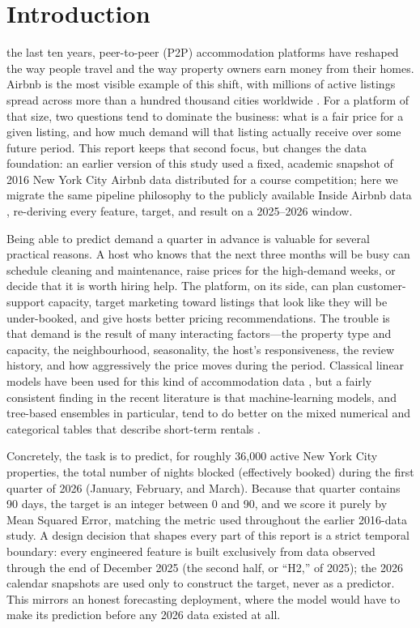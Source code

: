 \documentclass[journal]{IEEEtran}
\begin{document}
\section{Introduction}
 the last ten years, peer-to-peer (P2P) accommodation
platforms have reshaped the way people travel and the way property owners earn
money from their homes. Airbnb is the most visible example of this shift, with
millions of active listings spread across more than a hundred thousand cities
worldwide \cite{adamiak2018}. For a platform of that size, two questions tend
to dominate the business: what is a fair price for a given listing, and how
much demand will that listing actually receive over some future period. This
report keeps that second focus, but changes the data foundation: an earlier
version of this study used a fixed, academic snapshot of 2016 New York City
Airbnb data distributed for a course competition; here we migrate the same
pipeline philosophy to the publicly available Inside Airbnb data
\cite{insideairbnb}, re-deriving every feature, target, and result on a
2025--2026 window.

Being able to predict demand a quarter in advance is valuable for several
practical reasons. A host who knows that the next three months will be busy can
schedule cleaning and maintenance, raise prices for the high-demand weeks, or
decide that it is worth hiring help. The platform, on its side, can plan
customer-support capacity, target marketing toward listings that look like they
will be under-booked, and give hosts better pricing recommendations. The
trouble is that demand is the result of many interacting factors---the property
type and capacity, the neighbourhood, seasonality, the host's responsiveness,
the review history, and how aggressively the price moves during the period.
Classical linear models have been used for this kind of accommodation data
\cite{gunter2018,wang2017}, but a fairly consistent finding in the recent
literature is that machine-learning models, and tree-based ensembles in
particular, tend to do better on the mixed numerical and categorical tables
that describe short-term rentals \cite{tang2024,camatti2024,kalehbasti2019}.

Concretely, the task is to predict, for roughly 36{,}000 active New York City
properties, the total number of nights blocked (effectively booked) during the
first quarter of 2026 (January, February, and March). Because that quarter
contains 90 days, the target is an integer between 0 and 90, and we score it
purely by Mean Squared Error, matching the metric used throughout the earlier
2016-data study. A design decision that shapes every part of this report is a
strict temporal boundary: every engineered feature is built exclusively from
data observed through the end of December 2025 (the second half, or ``H2,'' of
2025); the 2026 calendar snapshots are used only to construct the target,
never as a predictor. This mirrors an honest forecasting deployment, where the
model would have to make its prediction before any 2026 data existed at all.
\end{document}
